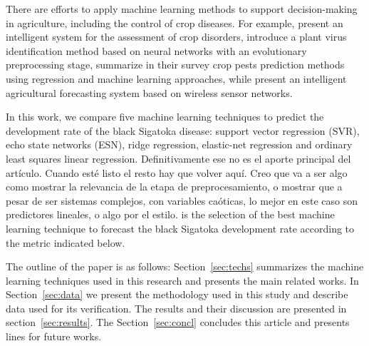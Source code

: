 There are efforts to apply machine learning methods to support
decision-making in agriculture, including the control of crop
diseases. For example, \cite{Camargo2012} present an intelligent
system for the assessment of crop disorders, \cite{Huang2010}
introduce a plant virus identification method based on neural networks
with an evolutionary preprocessing stage, \cite{Kim2014} summarize in
their survey crop pests prediction methods using regression and
machine learning approaches, while \cite{Zhao2013} present an
intelligent agricultural forecasting system based on wireless sensor
networks.

In this work, we compare five machine learning techniques to predict
the development rate of the black Sigatoka disease: support vector
regression (SVR), echo state networks (ESN), ridge regression,
elastic-net regression and ordinary least squares linear regression.
%
%
{Definitivamente ese no es el aporte principal del artículo.  Cuando
  esté listo el resto hay que volver aquí.  Creo que va a ser algo
  como mostrar la relevancia de la etapa de preprocesamiento, o
  mostrar que a pesar de ser sistemas complejos, con variables
  caóticas, lo mejor en este caso son predictores lineales, o algo por
  el estilo.} %
% 
 is the selection of the best machine learning technique
to forecast the black Sigatoka development rate according to the
metric indicated below.

The outline of the paper is as follows: Section~\ref{sec:techs}
summarizes the machine learning techniques used in this research and
presents the main related works. In Section~\ref{sec:data} we present
the methodology used in this study and describe data used for its
verification.  The results and their discussion are presented in
section~\ref{sec:results}.  The Section~\ref{sec:concl} concludes this
article and presents lines for future works.

